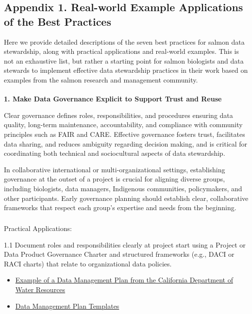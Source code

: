 \documentclass[
  letterpaper,
  DIV=11,
  numbers=noendperiod]{scrartcl}
\makeatletter
\let\oldparagraph\paragraph
\renewcommand{\paragraph}{
    \@ifstar
      \xxxParagraphStar
      \xxxParagraphNoStar
  }
\newcommand{\xxxParagraphStar}[1]{\oldparagraph*{#1}\mbox{}}
\newcommand{\xxxParagraphNoStar}[1]{\oldparagraph{#1}\mbox{}}
\let\oldsubparagraph\subparagraph
\renewcommand{\subparagraph}{
    \@ifstar
      \xxxSubParagraphStar
      \xxxSubParagraphNoStar
  }
\newcommand{\xxxSubParagraphStar}[1]{\oldsubparagraph*{#1}\mbox{}}
\newcommand{\xxxSubParagraphNoStar}[1]{\oldsubparagraph{#1}\mbox{}}
\makeatother
\begin{document}
\subsection{Appendix 1. Real-world Example Applications of the Best
Practices}\label{appendix-1.-real-world-example-applications-of-the-best-practices}

Here we provide detailed descriptions of the seven best practices for
salmon data stewardship, along with practical applications and
real-world examples. This is not an exhaustive list, but rather a
starting point for salmon biologists and data stewards to implement
effective data stewardship practices in their work based on examples
from the salmon research and management community.

\paragraph{\texorpdfstring{\textbf{1. Make Data Governance Explicit to
Support Trust and
Reuse}}{1. Make Data Governance Explicit to Support Trust and Reuse}}\label{make-data-governance-explicit-to-support-trust-and-reuse}

Clear governance defines roles, responsibilities, and procedures
ensuring data quality, long-term maintenance, accountability, and
compliance with community principles such as FAIR and CARE. Effective
governance fosters trust, facilitates data sharing, and reduces
ambiguity regarding decision making, and is critical for coordinating
both technical and sociocultural aspects of data stewardship.

In collaborative international or multi-organizational settings,
establishing governance at the outset of a project is crucial for
aligning diverse groups, including biologists, data managers, Indigenous
communities, policymakers, and other participants. Early governance
planning should establish clear, collaborative frameworks that respect
each group's expertise and needs from the beginning.~

\subparagraph{Practical Applications:}\label{practical-applications}

1.1 Document roles and responsibilities clearly at project start using a
Project or Data Product Governance Charter and structured frameworks
(e.g., DACI or RACI charts) that relate to organizational data policies.

\begin{itemize}
\item
  \href{https://raw.githubusercontent.com/Br-Johnson/sdm-paper/refs/heads/main/examples/Cal_DMP.pdf}{Example
  of a Data Management Plan from the California Department of Water
  Resources}
\item
  \href{https://dmptool.org/public_templates?page=ALL}{Data Management
  Plan Templates}
\end{itemize}
\end{document}
